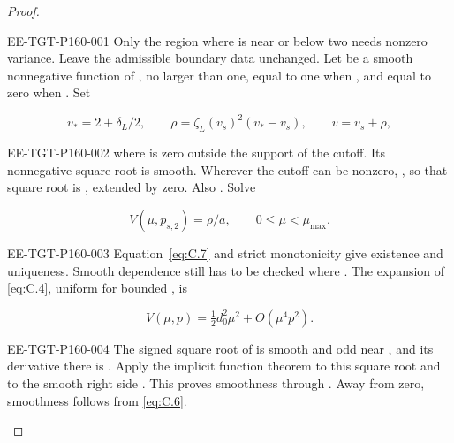 \begin{proof}
%
\begin{EESegment}{EE-TGT-P160-001}
Only the region where  is near or below two needs nonzero variance. Leave the
admissible boundary data unchanged. Let  be a smooth nonnegative function of
, no larger than one, equal to one when , and equal to zero when
. Set
\end{EESegment}
\begin{equation}
 v_*=2+\delta_L/2,
 \qquad \rho=\zeta_L(v_s)^2(v_*-v_s),
 \qquad v=v_s+\rho,
\tag{C.9}\label{eq:C.9}
\end{equation}
\begin{EESegment}{EE-TGT-P160-002}
where  is zero outside the support of the cutoff. Its nonnegative square root
is smooth. Wherever the cutoff can be nonzero, , so that square root is
, extended by zero. Also . Solve
\end{EESegment}
\begin{equation}
 V(\mu,p_{s,2})=\rho/a,
 \qquad 0\leq\mu<\mu_{\max}.
\tag{C.10}\label{eq:C.10}
\end{equation}
\begin{EESegment}{EE-TGT-P160-003}
Equation~\eqref{eq:C.7} and strict monotonicity give existence and uniqueness. Smooth dependence still has to be checked where . The expansion of \eqref{eq:C.4}, uniform for bounded
, is
\end{EESegment}
\[
 V(\mu,p)=\tfrac12d_0^2\mu^2+O(\mu^4p^2).
\]
\begin{EESegment}{EE-TGT-P160-004}
The signed square root of  is smooth and odd near , and its derivative there is
. Apply the
implicit function theorem to this square root and to the smooth right side
. This proves smoothness through . Away from zero, smoothness follows from \eqref{eq:C.6}.
\end{EESegment}


\end{proof}
